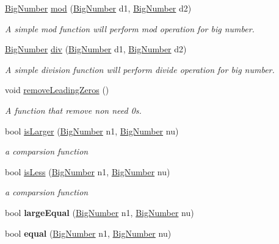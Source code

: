 \begin{DoxyCompactItemize}
\mbox{\hyperlink{class_big_number}{Big\+Number}} \mbox{\hyperlink{class_big_number_add3aefe34f81093bc56cc8243a4d7161}{mod}} (\mbox{\hyperlink{class_big_number}{Big\+Number}} d1, \mbox{\hyperlink{class_big_number}{Big\+Number}} d2)
\begin{DoxyCompactList}\small\item\em A simple mod function will perform mod operation for big number. \end{DoxyCompactList}\item 
\mbox{\hyperlink{class_big_number}{Big\+Number}} \mbox{\hyperlink{class_big_number_a645d17af03f7c4c9ad786fd8e2eba3ca}{div}} (\mbox{\hyperlink{class_big_number}{Big\+Number}} d1, \mbox{\hyperlink{class_big_number}{Big\+Number}} d2)
\begin{DoxyCompactList}\small\item\em A simple division function will perform divide operation for big number. \end{DoxyCompactList}\item 
void \mbox{\hyperlink{class_big_number_ae7ce33d3c89e7f420ad9b110c954007c}{remove\+Leading\+Zeros}} ()
\begin{DoxyCompactList}\small\item\em A function that remove non need 0s. \end{DoxyCompactList}\item 
bool \mbox{\hyperlink{class_big_number_a782520e52d7a51cb2e2b0f35fd9c92a3}{is\+Larger}} (\mbox{\hyperlink{class_big_number}{Big\+Number}} n1, \mbox{\hyperlink{class_big_number}{Big\+Number}} nu)
\begin{DoxyCompactList}\small\item\em a comparsion function \end{DoxyCompactList}\item 
bool \mbox{\hyperlink{class_big_number_a8869dba4135101501dd84028088d4766}{is\+Less}} (\mbox{\hyperlink{class_big_number}{Big\+Number}} n1, \mbox{\hyperlink{class_big_number}{Big\+Number}} nu)
\begin{DoxyCompactList}\small\item\em a comparsion function \end{DoxyCompactList}\item 
\mbox{\label{class_big_number_a6975cde06d2c24540b54dab767df2e94}} 
bool {\bfseries large\+Equal} (\mbox{\hyperlink{class_big_number}{Big\+Number}} n1, \mbox{\hyperlink{class_big_number}{Big\+Number}} nu)
\item 
\mbox{\label{class_big_number_a73d30de7df38a212e0c164f5db2dde65}} 
bool {\bfseries equal} (\mbox{\hyperlink{class_big_number}{Big\+Number}} n1, \mbox{\hyperlink{class_big_number}{Big\+Number}} nu)
\end{DoxyCompactItemize}
